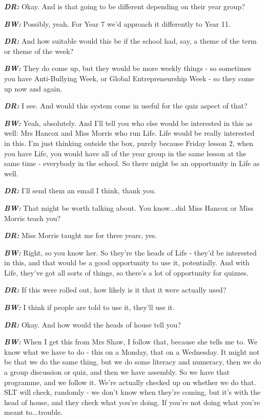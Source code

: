 \textit{\textbf{DR:}} Okay. And is that going to be different depending on their year group?

\textit{\textbf{BW:}} Possibly, yeah. For Year 7 we'd approach it differently to Year 11.

\textit{\textbf{DR:}} And how suitable would this be if the school had, say, a theme of the term or theme of the week?

\textit{\textbf{BW:}} They do come up, but they would be more weekly things - so sometimes you have Anti-Bullying Week, or Global Entrepreneurship Week - so they come up now and again.

\textit{\textbf{DR:}} I see. And would this system come in useful for the quiz aspect of that?

\textit{\textbf{BW:}} Yeah, absolutely. And I'll tell you who else would be interested in this as well: Mrs Hancox and Miss Morris who run Life. Life would be really interested in this. I'm just thinking outside the box, purely because Friday lesson 2, when you have Life, you would have all of the year group in the same lesson at the same time - everybody in the school. So there might be an opportunity in Life as well.

\textit{\textbf{DR:}} I'll send them an email I think, thank you.

\textit{\textbf{BW:}} That might be worth talking about. You know...did Miss Hancox or Miss Morris teach you?

\textit{\textbf{DR:}} Miss Morris taught me for three years, yes.

\textit{\textbf{BW:}} Right, so you know her. So they're the heads of Life - they'd be interested in this, and that would be a good opportunity to use it, potentially. And with Life, they've got all sorts of things, so there's a lot of opportunity for quizzes.

\textit{\textbf{DR:}} If this were rolled out, how likely is it that it were actually used?

\textit{\textbf{BW:}} I think if people are told to use it, they'll use it.

\textit{\textbf{DR:}} Okay. And how would the heads of house tell you?

\textit{\textbf{BW:}} When I get this from Mrs Shaw, I follow that, because she tells me to. We know what we have to do - this on a Monday, that on a Wednesday. It might not be that we do the same thing, but we do some literacy and numeracy, then we do a group discussion or quiz, and then we have assembly. So we have that programme, and we follow it. We're actually checked up on whether we do that. SLT will check, randomly - we don't know when they're coming, but it's with the head of house, and they check what you're doing. If you're not doing what you're meant to...trouble.

